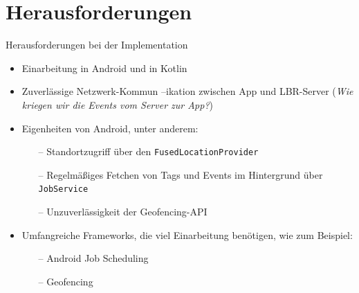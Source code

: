\documentclass{beamer}
\begin{document}
	\section{Herausforderungen}
	\begin{frame}{Herausforderungen bei der Implementation}
		\begin{itemize}
			\item \alert<1>{Einarbeitung} in Android und in Kotlin
			\item Zuverlässige \alert<2>{Netzwerk-Kommun --ikation} zwischen App und LBR-Server (\textit{Wie kriegen wir die Events vom Server zur App?})
			\item \alert<3>{Eigenheiten} von Android, unter anderem:
				\begin{itemize}
					\item[--] Standortzugriff über den \texttt{FusedLocationProvider}
					\item[--] Regelmäßiges Fetchen von Tags und Events im Hintergrund über \texttt{JobService}
					\item[--] Unzuverlässigkeit der Geofencing-API
				\end{itemize}
			\item Umfangreiche \alert<4>{Frameworks}, die viel Einarbeitung benötigen, wie zum Beispiel:
				\begin{itemize}
					\item[--] Android Job Scheduling
					\item[--] Geofencing
				\end{itemize}
		\end{itemize}
	\end{frame}
\end{document}
